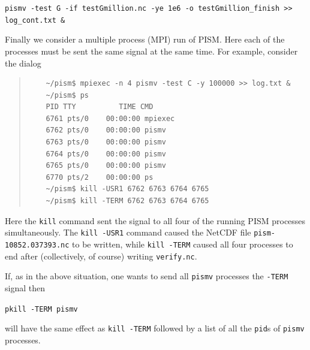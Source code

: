 \documentclass[11pt,final]{amsart}
\begin{document}
\verb|pismv -test G -if testGmillion.nc -ye 1e6 -o testGmillion_finish >> log_cont.txt &|
\smallskip

Finally we consider a multiple process (MPI) run of PISM.  Here each of the processes must be sent the same signal at the same time.  For example, consider the dialog
\begin{quote}
\begin{verbatim}
	~/pism$ mpiexec -n 4 pismv -test C -y 100000 >> log.txt &
	~/pism$ ps
	PID TTY          TIME CMD
	6761 pts/0    00:00:00 mpiexec
	6762 pts/0    00:00:00 pismv
	6763 pts/0    00:00:00 pismv
	6764 pts/0    00:00:00 pismv
	6765 pts/0    00:00:00 pismv
	6770 pts/2    00:00:00 ps
	~/pism$ kill -USR1 6762 6763 6764 6765
	~/pism$ kill -TERM 6762 6763 6764 6765
\end{verbatim}
\end{quote}
Here the \verb|kill| command sent the signal to all four of the running PISM processes simultaneously.  The \verb|kill -USR1| command caused the NetCDF file \verb|pism-10852.037393.nc| to be written, while \verb|kill -TERM| caused all four processes to end after (collectively, of course) writing \verb|verify.nc|.

If, as in the above situation, one wants to send all \verb|pismv| processes the \verb|-TERM| signal then 

  \verb|pkill -TERM pismv|

\noindent will have the same effect as \verb|kill -TERM| followed by a list of all the \verb|pid|s of \verb|pismv| processes.
\end{document}
